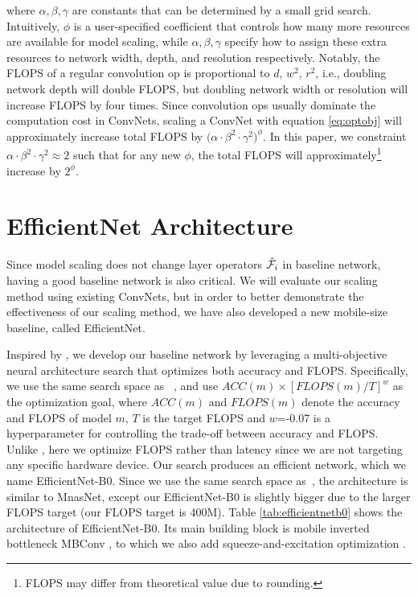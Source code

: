 \documentclass{article}
\begin{document}
where $\alpha, \beta, \gamma$ are constants that can be determined by a small grid search.  Intuitively,  $\phi$ is a user-specified coefficient that controls how many more resources are available for model scaling, while $\alpha, \beta, \gamma$  specify how to assign these extra resources to network width, depth, and resolution respectively. Notably, the FLOPS of a regular convolution op is proportional to $d$, $w^2$, $r^2$, i.e., doubling network depth will double FLOPS, but doubling network width or resolution will increase FLOPS by four times. Since convolution ops usually dominate the computation cost in ConvNets, scaling a ConvNet with equation \ref{eq:optobj} will approximately increase total FLOPS by $\big(\alpha \cdot \beta ^2 \cdot \gamma ^2 \big)^\phi$.
In this paper, we constraint $\alpha \cdot \beta ^2 \cdot \gamma ^ 2 \approx 2$ such that for any new $\phi$, the total FLOPS will approximately\footnote{FLOPS may differ from theoretical value due to rounding.} increase by $2^\phi$. %


\section{EfficientNet Architecture}
\label{sec:method}

Since model scaling does not change layer operators $\mathcal{\hat F}_i$ in baseline network, having a good baseline network is also critical.  We will evaluate our scaling method using existing ConvNets, but in order to better demonstrate the effectiveness of our scaling method, we have also developed a new mobile-size baseline, called EfficientNet.

Inspired by \cite{mnas18}, we develop our baseline network by leveraging a multi-objective neural architecture search that optimizes both accuracy and FLOPS.
Specifically, we use the same search space as ~\cite{mnas18},  and use $ACC(m) \times [FLOPS(m)/T]^w$ as the optimization goal, where $ACC(m)$ and $FLOPS(m)$ denote the accuracy and FLOPS of model $m$, $T$ is the target FLOPS and $w$=-0.07 is a hyperparameter for controlling the trade-off between accuracy and FLOPS. Unlike \cite{mnas18,proxyless18}, here we optimize FLOPS rather than latency since we are not targeting any specific hardware device. Our search produces an efficient network, which we name EfficientNet-B0. Since we use the same search space as~\cite{mnas18}, the architecture is similar to MnasNet, except our EfficientNet-B0 is slightly bigger due to the larger FLOPS target (our FLOPS target is 400M).
Table \ref{tab:efficientnetb0} shows the architecture of EfficientNet-B0. Its main building block is mobile inverted bottleneck MBConv \cite{mobilenetv218,mnas18}, to which we also add squeeze-and-excitation optimization \cite{senet18}.
\end{document}
